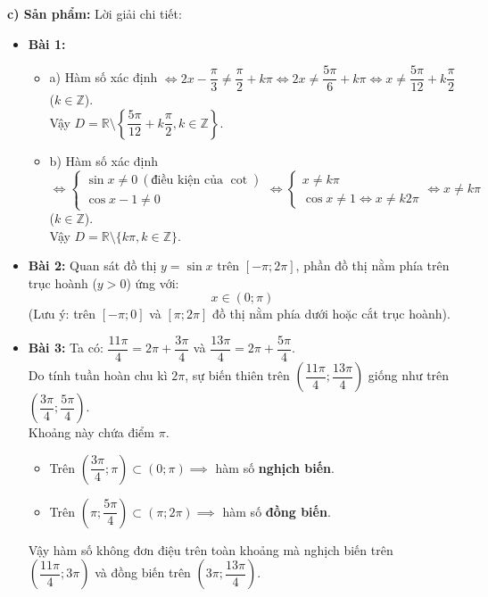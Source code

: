 \documentclass[12pt, a4paper]{article}
\begin{document}
\textbf{c) Sản phẩm:} Lời giải chi tiết:
\begin{itemize}[leftmargin=0.6cm]
    \item \textbf{Bài 1:}
    \begin{itemize}[leftmargin=0.5cm]
        \item a) Hàm số xác định $\iff 2x - \dfrac{\pi}{3} \neq \dfrac{\pi}{2} + k\pi \iff 2x \neq \dfrac{5\pi}{6} + k\pi \iff x \neq \dfrac{5\pi}{12} + k\dfrac{\pi}{2}$ ($k \in \mathbb{Z}$).\\
        Vậy $D = \mathbb{R} \setminus \left\{\dfrac{5\pi}{12} + k\dfrac{\pi}{2}, k \in \mathbb{Z}\right\}$.
        \item b) Hàm số xác định $\iff \begin{cases} \sin x \neq 0 \ (\text{điều kiện của } \cot) \\ \cos x - 1 \neq 0 \end{cases} \iff \begin{cases} x \neq k\pi \\ \cos x \neq 1 \iff x \neq k2\pi \end{cases} \iff x \neq k\pi$ ($k \in \mathbb{Z}$).\\
        Vậy $D = \mathbb{R} \setminus \{k\pi, k \in \mathbb{Z}\}$.
    \end{itemize}
    \item \textbf{Bài 2:}
    Quan sát đồ thị $y = \sin x$ trên $[-\pi; 2\pi]$, phần đồ thị nằm phía trên trục hoành ($y > 0$) ứng với:
    $$x \in (0; \pi)$$
    (Lưu ý: trên $[-\pi; 0]$ và $[\pi; 2\pi]$ đồ thị nằm phía dưới hoặc cắt trục hoành).
    \item \textbf{Bài 3:}
    Ta có: $\dfrac{11\pi}{4} = 2\pi + \dfrac{3\pi}{4}$ và $\dfrac{13\pi}{4} = 2\pi + \dfrac{5\pi}{4}$.\\
    Do tính tuần hoàn chu kì $2\pi$, sự biến thiên trên $\left(\dfrac{11\pi}{4}; \dfrac{13\pi}{4}\right)$ giống như trên $\left(\dfrac{3\pi}{4}; \dfrac{5\pi}{4}\right)$.\\
    Khoảng này chứa điểm $\pi$.
    \begin{itemize}[leftmargin=0.5cm]
        \item Trên $\left(\dfrac{3\pi}{4}; \pi\right) \subset (0; \pi) \implies$ hàm số \textbf{nghịch biến}.
        \item Trên $\left(\pi; \dfrac{5\pi}{4}\right) \subset (\pi; 2\pi) \implies$ hàm số \textbf{đồng biến}.
    \end{itemize}
    Vậy hàm số không đơn điệu trên toàn khoảng mà nghịch biến trên $\left(\dfrac{11\pi}{4}; 3\pi\right)$ và đồng biến trên $\left(3\pi; \dfrac{13\pi}{4}\right)$.
\end{itemize}
\end{document}
